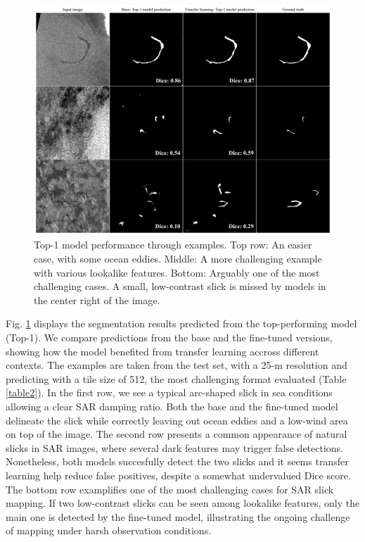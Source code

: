 \documentclass[journal]{IEEEtran}
\begin{document}
\begin{figure}[!t]
    \centering
    \includegraphics[width=6.2in]{figures/preds4x3_v2.png}
    \caption{Top-1 model performance through examples. \quad Top row: An easier case, with some ocean eddies. \quad Middle: A more challenging example with 
    various lookalike features. \quad Bottom: Arguably one of the most challenging cases. A small, low-contrast slick is missed by models in the center right of the image.}
    \label{figure3}
\end{figure}
Fig. \ref{figure3} displays the segmentation results predicted from the top-performing model (Top-1). We compare predictions from the base and the fine-tuned
versions, showing how the model benefited from transfer learning accross different contexts. The examples are taken from the test set, with a 25-m resolution and predicting 
with a tile size of 512, the most challenging format evaluated (Table \ref{table2}). In the first row, we see a typical arc-shaped slick in sea conditions allowing a clear SAR damping ratio. 
Both the base and the fine-tuned model delineate the slick while correctly leaving out ocean eddies and a low-wind area on top of the image. The second row presents a common appearance 
of natural slicks in SAR images, where several dark features may trigger false detections. Nonetheless, both models succesfully detect the two slicks and it seems transfer learning help reduce
false positives, despite a somewhat undervalued Dice score. The bottom row examplifies one of the most challenging cases for SAR slick mapping. If two low-contrast slicks can be seen among lookalike features,
only the main one is detected by the fine-tuned model, illustrating the ongoing challenge of mapping under harsh observation conditions. 
\end{document}
